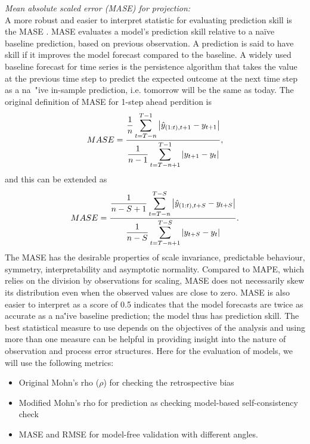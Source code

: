 \vspace{0.2cm} \noindent
{\it Mean absolute scaled error (MASE) for projection:}\\ 
A more robust and easier to interpret statistic for evaluating prediction skill is the MASE \citep{hyndman2006another}. MASE evaluates a model's prediction skill relative to a na\" {i}ve baseline prediction, based on previous observation. A prediction is said to have skill if it improves the model forecast compared to the baseline. A widely used baseline forecast for time series is the persistence algorithm that takes the value at the previous time step to predict the expected outcome at the next time step as a na\ "{i}ve in-sample prediction, i.e. tomorrow will be the same as today. The original definition of MASE for 1-step ahead perdition is 
\begin{equation}
{MASE=\frac{\displaystyle\frac{1}{n} \sum_{t=T-n}^{T-1} \left| \hat{y}_{(1:t),t+1}-y_{t+1} \right|}
{\displaystyle\frac{1}{n-1} \sum_{t=T-n+1}^{T-1} \left|y_{t+1}-y_{t}\right|}}, 
\end{equation}
and this can be extended as 
\begin{equation}
MASE=
\frac{\displaystyle \frac{1}{n-S+1} \sum_{t=T-n}^{T-S}  \left| \hat{y}_{(1:t),t+S}-y_{t+S} \right|}
{\displaystyle \frac{1}{n-S} \sum_{t=T-n+1}^{T-S} \left|y_{t+S}-y_{t}\right|}. 
\end{equation} 
The MASE has the desirable properties of scale invariance, predictable behaviour, symmetry, interpretability and asymptotic normality. Compared to MAPE, which relies on the division by observations for scaling, MASE does not necessarily skew its distribution even when the observed values are close to zero. MASE is also easier to interpret as a score of 0.5 indicates that the model forecasts are twice as accurate as a na\''{i}ve baseline prediction; the model thus has prediction skill.
\vspace{0.2cm} 
The best statistical measure to use depends on the objectives of the analysis and using more than one measure can be helpful in providing insight into the nature of observation and process error structures. Here for the evaluation of models, we will use the following metrics: 
\begin{itemize}
\item Original Mohn's rho ($\rho$) for checking the retrospective bias \\
\vspace{-0.3cm}
\item Modified Mohn's rho for prediction  as checking model-based self-consistency check \\
\vspace{-0.3cm}
\item MASE and RMSE for model-free validation with different angles. 
\end{itemize}
